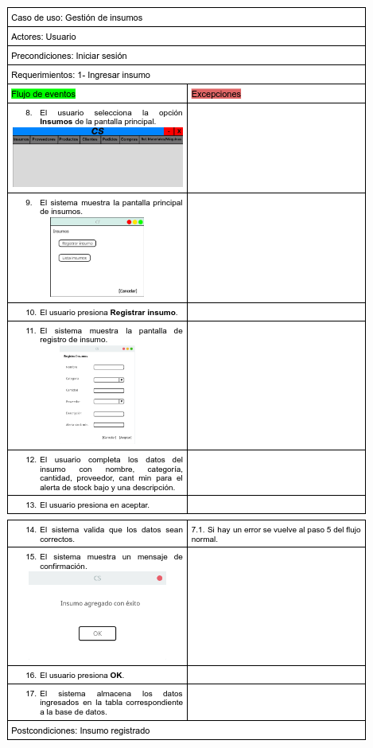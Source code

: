 \documentclass{article}
\begin{document}
	\begin{center}
		\includegraphics[width=1\linewidth]{imagenes/especificacion_insumos.png}
		\clearpage
		\includegraphics[width=1\linewidth]{imagenes/especificacion_insumos2.png}
	\end{center}
	
\end{document}
